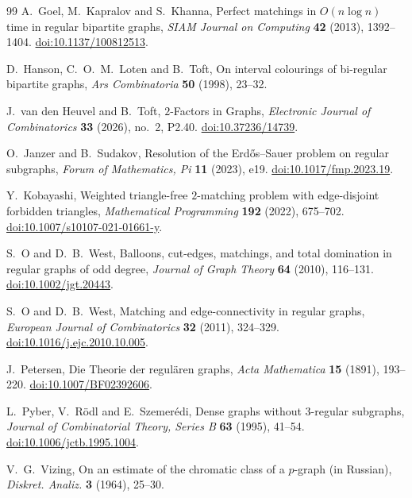 \documentclass[11pt]{amsart}
\theoremstyle{remark}
\begin{document}
\begin{thebibliography}{99}
A.~Goel, M.~Kapralov and S.~Khanna, Perfect matchings in $O(n\log n)$ time in regular bipartite graphs,
\emph{SIAM Journal on Computing} \textbf{42} (2013), 1392--1404.
\href{https://doi.org/10.1137/100812513}{doi:10.1137/100812513}.

D.~Hanson, C.~O.~M.~Loten and B.~Toft, On interval colourings of bi-regular bipartite graphs,
\emph{Ars Combinatoria} \textbf{50} (1998), 23--32.

J.~van den Heuvel and B.~Toft, $2$-Factors in Graphs,
\emph{Electronic Journal of Combinatorics} \textbf{33} (2026), no.~2, P2.40.
\href{https://doi.org/10.37236/14739}{doi:10.37236/14739}.

O.~Janzer and B.~Sudakov, Resolution of the Erd\H{o}s--Sauer problem on regular subgraphs,
\emph{Forum of Mathematics, Pi} \textbf{11} (2023), e19.
\href{https://doi.org/10.1017/fmp.2023.19}{doi:10.1017/fmp.2023.19}.

Y.~Kobayashi, Weighted triangle-free $2$-matching problem with edge-disjoint forbidden triangles,
\emph{Mathematical Programming} \textbf{192} (2022), 675--702.
\href{https://doi.org/10.1007/s10107-021-01661-y}{doi:10.1007/s10107-021-01661-y}.

S.~O and D.~B.~West, Balloons, cut-edges, matchings, and total domination in regular graphs of odd degree,
\emph{Journal of Graph Theory} \textbf{64} (2010), 116--131.
\href{https://doi.org/10.1002/jgt.20443}{doi:10.1002/jgt.20443}.

S.~O and D.~B.~West, Matching and edge-connectivity in regular graphs,
\emph{European Journal of Combinatorics} \textbf{32} (2011), 324--329.
\href{https://doi.org/10.1016/j.ejc.2010.10.005}{doi:10.1016/j.ejc.2010.10.005}.

J.~Petersen, Die Theorie der regul\"aren graphs,
\emph{Acta Mathematica} \textbf{15} (1891), 193--220.
\href{https://doi.org/10.1007/BF02392606}{doi:10.1007/BF02392606}.

L.~Pyber, V.~R\"odl and E.~Szemer\'edi, Dense graphs without $3$-regular subgraphs,
\emph{Journal of Combinatorial Theory, Series B} \textbf{63} (1995), 41--54.
\href{https://doi.org/10.1006/jctb.1995.1004}{doi:10.1006/jctb.1995.1004}.

V.~G.~Vizing, On an estimate of the chromatic class of a $p$-graph (in Russian),
\emph{Diskret. Analiz.} \textbf{3} (1964), 25--30.

\end{thebibliography}
\end{document}
